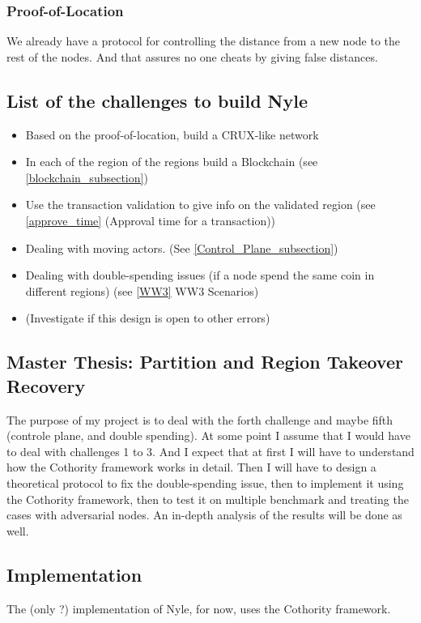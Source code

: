 \subsubsection{Proof-of-Location}
We already have a protocol for controlling the distance from a new node to the rest of the nodes. And that assures no one cheats by giving false distances. 


\subsection{List of the challenges to build Nyle} 
\begin{itemize}
 \item Based on the proof-of-location, build a CRUX-like network 
 \item In each of the region of the regions build a Blockchain (see \ref{blockchain_subsection})
 \item Use the transaction validation to give info on the validated region (see \ref{approve_time} (Approval time for a transaction))
 \item Dealing with moving actors. (See \ref{Control_Plane_subsection})
 \item Dealing with double-spending issues (if a node spend the same coin in different regions) (see \ref{WW3} WW3 Scenarios)
 \item (Investigate if this design is open to other errors)
 
\end{itemize}

\subsection{Master Thesis:  Partition and Region Takeover Recovery}

The purpose of my project is to deal with the forth challenge and maybe fifth (controle plane, and double spending). At some point I assume that I would have to deal with challenges 1 to 3. And I expect that at first I will have to understand how the Cothority framework works in detail. Then I will have to design a theoretical protocol to fix the double-spending issue, then to implement it using the Cothority framework, then to test it on multiple benchmark and treating the cases with adversarial nodes. An in-depth analysis of the results will be done as well.
\subsection{Implementation}
The (only ?) implementation of Nyle, for now, uses the Cothority framework. 

